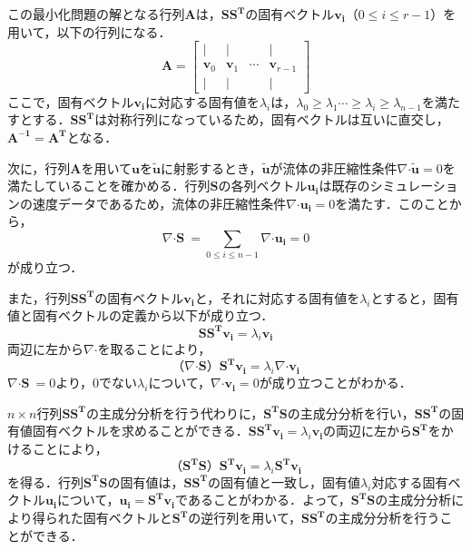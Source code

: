 \documentclass[a4j,12pt]{jreport}
\begin{document}
この最小化問題の解となる行列$\mathbf{A}$は，$\mathbf{S}\mathbf{S^T}$の固有ベクトル$\bm{v_i}（0 \le i \le r-1）$を用いて，以下の行列になる．
 \[ 
 \mathbf{A}  = 
        		\begin{bmatrix}
   | & | &  & |\\
   \bm{v}_0 & \bm{v}_1 &\cdots  & \bm{v}_{r-1} \\
   | & | &  & |
\end{bmatrix}
\]
ここで，固有ベクトル$\bm{v_i}$に対応する固有値を$\lambda_i$は，$\lambda_0 \ge \lambda_1 \cdots \ge \lambda_i \ge \lambda_{n-1} $を満たすとする．$\mathbf{S}\mathbf{S^T}$は対称行列になっているため，固有ベクトルは互いに直交し，$\mathbf{A^{-1}} = \mathbf{A^T}$となる．%

次に，行列$\mathbf{A}$を用いて$\bm{u}$を$\bm{\tilde{u}}$に射影するとき，$\bm{\tilde{u}}$が流体の非圧縮性条件$\nabla\boldsymbol{\cdot}\bm{\tilde{u}} = 0$を満たしていることを確かめる．行列$\mathbf{S}$の各列ベクトル$\bm{u_i}$は既存のシミュレーションの速度データであるため，流体の非圧縮性条件$\nabla\boldsymbol{\cdot}\bm{u_i} = 0$を満たす．このことから，
\[
	\nabla\boldsymbol{\cdot}\mathbf{S}\ = \sum_{0 \le i \le n-1}\nabla\boldsymbol{\cdot}\bm{u_i} = 0
\]
が成り立つ．

また，行列$\mathbf{S}\mathbf{S^T}$の固有ベクトル$\bm{v_i}$と，それに対応する固有値を$\lambda_i$とすると，固有値と固有ベクトルの定義から以下が成り立つ．
\[
	\mathbf{S}\mathbf{S^T}\bm{v_i} = \lambda_i\bm{v_i}
\]
両辺に左から$\nabla\boldsymbol{\cdot}$を取ることにより，
\[
	（\nabla\boldsymbol{\cdot}\mathbf{S}）\mathbf{S^T}\bm{v_i} = \lambda_i\nabla\boldsymbol{\cdot}\bm{v_i}
\]
$\nabla\boldsymbol{\cdot}\mathbf{S}\ = 0$より，0でない$ \lambda_i$について，$\nabla\boldsymbol{\cdot}\bm{v_i} = 0$が成り立つことがわかる．

$n \times n$行列$\mathbf{S}\mathbf{S^T}$の主成分分析を行う代わりに，$\mathbf{S^T}\mathbf{S}$の主成分分析を行い，$\mathbf{S}\mathbf{S^T}$の固有値固有ベクトルを求めることができる．$\mathbf{S}\mathbf{S^T}\bm{v_i} = \lambda_i\bm{v_i}$の両辺に左から$\mathbf{S^T}$をかけることにより，
\[
	（\mathbf{S^T}\mathbf{S}）\mathbf{S^T}\bm{v_i} = \lambda_i\mathbf{S^T}\bm{v_i}
\]
を得る．行列$\mathbf{S^T}\mathbf{S}$の固有値は，$\mathbf{S}\mathbf{S^T}$の固有値と一致し，固有値$\lambda_i$対応する固有ベクトル$\bm{u_i}$について，$\bm{u_i} = \mathbf{S^T}\bm{v_i}$であることがわかる．よって，$\mathbf{S^T}\mathbf{S}$の主成分分析により得られた固有ベクトルと$\mathbf{S^T}$の逆行列を用いて，$\mathbf{S}\mathbf{S^T}$の主成分分析を行うことができる．
\end{document}
